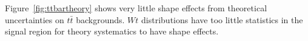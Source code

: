 %

Figure~\ref{fig:ttbartheory} shows very little shape effects from theoretical uncertainties on $t\bar{t}$ backgrounds. $Wt$ distributions have too little statistics in the signal region for theory systematics to have shape effects.

